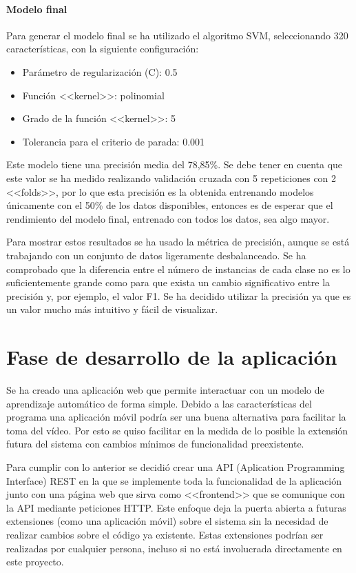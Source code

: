 \paragraph{Modelo final} Para generar el modelo final se ha utilizado el
algoritmo SVM, seleccionando 320 características, con la siguiente
configuración:

\begin{itemize}
    \item Parámetro de regularización (C): 0.5
    \item Función <<kernel>>: polinomial
    \item Grado de la función <<kernel>>: 5
    \item Tolerancia para el criterio de parada: 0.001
\end{itemize}

Este modelo tiene una precisión media del 78,85\%. Se debe tener en cuenta que
este valor se ha medido realizando validación cruzada con 5 repeticiones con 2
<<folds>>, por lo que esta precisión es la obtenida entrenando modelos
únicamente con el 50\% de los datos disponibles, entonces es de esperar que el
rendimiento del modelo final, entrenado con todos los datos, sea algo mayor.

Para mostrar estos resultados se ha usado la métrica de precisión, aunque se
está trabajando con un conjunto de datos ligeramente desbalanceado. Se ha
comprobado que la diferencia entre el número de instancias de cada clase no es
lo suficientemente grande como para que exista un cambio significativo entre la
precisión y, por ejemplo, el valor F1. Se ha decidido utilizar la precisión ya
que es un valor mucho más intuitivo y fácil de visualizar.

\section{Fase de desarrollo de la aplicación}

Se ha creado una aplicación web que permite interactuar con un modelo de
aprendizaje automático de forma simple. Debido a las características del
programa una aplicación móvil podría ser una buena alternativa para facilitar la
toma del vídeo. Por esto se quiso facilitar en la medida de lo posible la
extensión futura del sistema con cambios mínimos de funcionalidad preexistente.

Para cumplir con lo anterior se decidió crear una API (Aplication Programming
Interface) REST en la que se implemente toda la funcionalidad de la aplicación
junto con una página web que sirva como <<frontend>> que se comunique con la API
mediante peticiones HTTP. Este enfoque deja la puerta abierta a futuras
extensiones (como una aplicación móvil) sobre el sistema sin la necesidad de
realizar cambios sobre el código ya existente. Estas extensiones podrían ser
realizadas por cualquier persona, incluso si no está involucrada directamente en
este proyecto.

